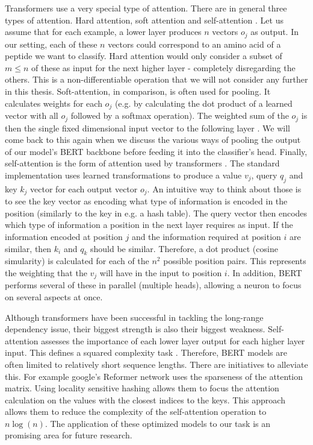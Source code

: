 \documentclass[msc,deptreport,ai]{infthesis} %
\begin{document}
		Transformers use a very special type of attention. There are in general three types of attention. Hard attention, soft attention and self-attention \cite{antoniou_mlp_2020}. Let us assume that for each example, a lower layer produces $n$ vectors $o_j$ as output. In our setting, each of these $n$ vectors could correspond to an amino acid of a peptide we want to classify.	
		Hard attention would only consider a subset of $m \leq n$ of these as input for the next higher layer - completely disregarding the others. This is a non-differentiable operation that we will not consider any further in this thesis. 
		Soft-attention, in comparison, is often used for pooling. It calculates weights for each $o_j$ (e.g. by calculating the dot product of a learned vector with all $o_j$ followed by a softmax operation). The weighted sum of the $o_j$ is then the single fixed dimensional input vector to the following layer \cite{toshniwal_cross-task_2020}. We will come back  to this again when we discuss the various ways of pooling the output of our model's \gls{BERT} backbone before feeding it into the classifier's head. 
		Finally, self-attention is the form of attention used by transformers \cite{vaswani_attention_2017}. The standard implementation uses learned transformations to produce a value $v_j$, query $q_j$ and key $k_j$ vector for each output vector $o_j$. An intuitive way to think about those is to see the key vector as encoding what type of information is encoded in the position (similarly to the key in e.g. a hash table). The query vector then encodes which type of information a position in the next layer requires as input. If the information encoded at position $j$ and the information required at position $i$ are similar, then $k_i$ and $q_k$ should be similar. Therefore, a dot product (cosine simularity) is calculated for each of the $n^2$ possible position pairs. This represents the weighting that the $v_j$ will have in the input to position $i$. In addition, \gls{BERT} performs several of these in parallel (multiple heads), allowing a neuron to focus on several aspects at once.
		
		Although transformers have been successful in tackling the long-range dependency issue, their biggest strength is also their biggest weakness. Self-attention assesses the importance of each lower layer output for each higher layer input. This defines a squared complexity task \cite{lukasz_kaiser_attention_2017}. Therefore, \gls{BERT} models are often limited to relatively short sequence lengths. There are initiatives to alleviate this. For example google's Reformer \cite{kitaev_reformer_2020} network uses the sparseness of the attention matrix. Using locality sensitive hashing allows them to focus the attention calculation on the values with the closest indices to the keys. This approach allows them to reduce the complexity of the self-attention operation to $n\log(n)$. The application of these optimized models to our task is an promising area for future research.
		
\end{document}
